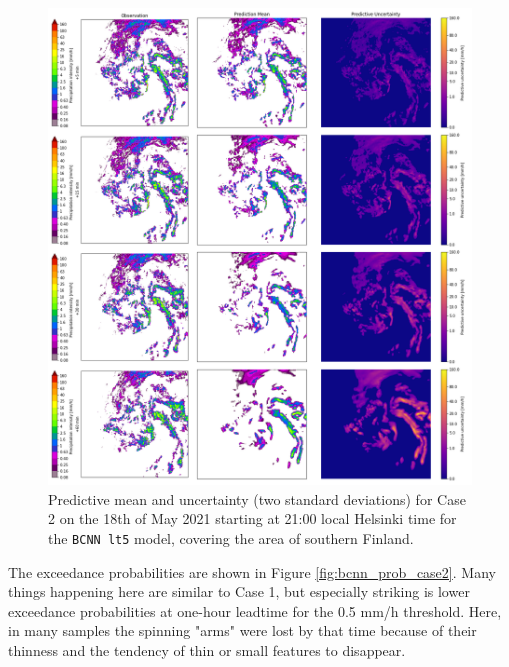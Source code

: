 \begin{figure}[H]
	\centering
	\includegraphics[width=\textwidth]{images/cases/bcnn_mean_case2}
	\caption{Predictive mean and uncertainty (two standard deviations) for Case 2 on the 18th of May 2021 starting at 21:00 local Helsinki time for the \texttt{BCNN lt5} model, covering the area of southern Finland.}
	\label{fig:bcnn_mean_case2}
\end{figure}

The exceedance probabilities are shown in Figure \ref{fig:bcnn_prob_case2}. Many things happening here are similar to Case 1, but especially striking is lower exceedance probabilities at one-hour leadtime for the 0.5 mm/h threshold. Here, in many samples the spinning "arms" were lost by that time because of their thinness and the tendency of thin or small features to disappear. 

